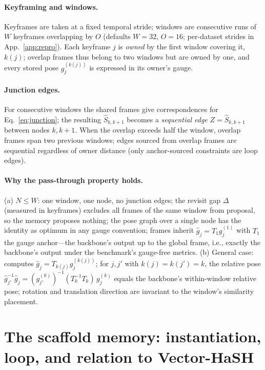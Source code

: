 \paragraph{Keyframing and windows.}
Keyframes are taken at a fixed temporal stride; windows are consecutive
runs of $W$ keyframes overlapping by $O$ (defaults $W{=}32$, $O{=}16$;
per-dataset strides in App.~\ref{app:repro}). Each keyframe $j$ is
\emph{owned} by the first window covering it, $k(j)$; overlap frames thus
belong to two windows but are owned by one, and every stored pose
$g_j^{(k(j))}$ is expressed in its owner's gauge.

\paragraph{Junction edges.}
For consecutive windows the shared frames give correspondences for
Eq.~\ref{eq:junction}; the resulting $\hat S_{k,k+1}$ becomes a
\emph{sequential edge} $Z=\hat S_{k,k+1}$ between nodes $k,k{+}1$. When the
overlap exceeds half the window, overlap frames span two previous windows;
edges sourced from overlap frames are sequential regardless of owner
distance (only anchor-sourced constraints are loop edges).

\paragraph{Why the pass-through property holds.}
(a) $N\le W$: one window, one node, no junction edges; the revisit gap
$\Delta$ (measured in keyframes) excludes all frames of the same window
from proposal, so the memory proposes nothing; the pose graph over a
single node has the identity as optimum in any gauge convention; frames
inherit $\hat g_j = T_1 g_j^{(1)}$ with $T_1$ the gauge anchor---the
backbone's output up to the global frame, i.e., exactly the backbone's
output under the benchmark's gauge-free metrics. (b) General case: \smr{}
computes $\hat g_j = T_{k(j)} g_j^{(k(j))}$; for $j,j'$ with
$k(j){=}k(j'){=}k$, the relative pose
$\hat g_{j'}^{-1}\hat g_j = (g^{(k)}_{j'})^{-1} (T_k^{-1}T_k)\, g^{(k)}_j$
equals the backbone's within-window relative pose; rotation and translation
direction are invariant to the window's similarity placement.

\section{The scaffold memory: instantiation, loop, and relation to Vector-HaSH}
\label{app:vhash}

